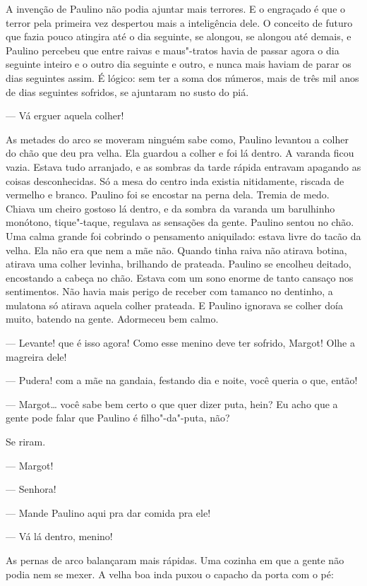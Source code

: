 A invenção de Paulino não podia ajuntar mais terrores. E o engraçado é
que o terror pela primeira vez despertou mais a inteligência dele. O
conceito de futuro que fazia pouco atingira até o dia seguinte, se
alongou, se alongou até demais, e Paulino percebeu que entre raivas e
maus"-tratos havia de passar agora o dia seguinte inteiro e o outro dia
seguinte e outro, e nunca mais haviam de parar os dias seguintes assim.
É lógico: sem ter a soma dos números, mais de três mil anos de dias
seguintes sofridos, se ajuntaram no susto do piá.

--- Vá erguer aquela colher!

As metades do arco se moveram ninguém sabe como, Paulino levantou a
colher do chão que deu pra velha. Ela guardou a colher e foi lá dentro.
A varanda ficou vazia. Estava tudo arranjado, e as sombras da tarde
rápida entravam apagando as coisas desconhecidas. Só a mesa do centro
inda existia nitidamente, riscada de vermelho e branco. Paulino foi se
encostar na perna dela. Tremia de medo. Chiava um cheiro gostoso lá
dentro, e da sombra da varanda um barulhinho monótono, tique"-taque,
regulava as sensações da gente. Paulino sentou no chão. Uma calma grande
foi cobrindo o pensamento aniquilado: estava livre do tacão da velha.
Ela não era que nem a mãe não. Quando tinha raiva não atirava botina,
atirava uma colher levinha, brilhando de prateada. Paulino se encolheu
deitado, encostando a cabeça no chão. Estava com um sono enorme de tanto
cansaço nos sentimentos. Não havia mais perigo de receber com tamanco no
dentinho, a mulatona só atirava aquela colher prateada. E Paulino
ignorava se colher doía muito, batendo na gente. Adormeceu bem calmo.

--- Levante! que é isso agora! Como esse menino deve ter sofrido,
Margot! Olhe a magreira dele!

--- Pudera! com a mãe na gandaia, festando dia e noite, você queria o
que, então!

--- Margot\ldots{} você sabe bem certo o que quer dizer puta, hein? Eu acho
que a gente pode falar que Paulino é filho"-da"-puta, não?

Se riram.

--- Margot!

--- Senhora!

--- Mande Paulino aqui pra dar comida pra ele!

--- Vá lá dentro, menino!

As pernas de arco balançaram mais rápidas. Uma cozinha em que a gente
não podia nem se mexer. A velha boa inda puxou o capacho da porta com o
pé:

